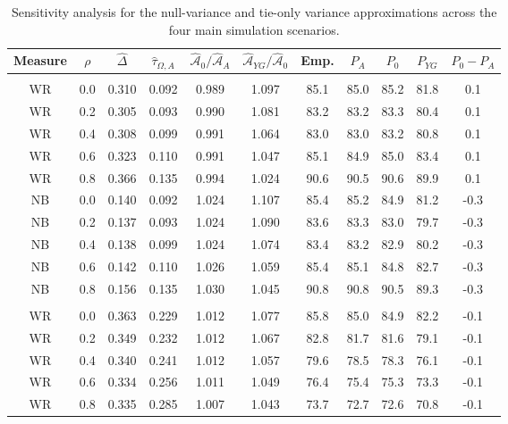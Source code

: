 \begin{table}[p]
\centering
\caption{Sensitivity analysis for the null-variance and tie-only variance approximations across the four main simulation scenarios.}
\label{tab:appendix_equal_variance_sensitivity_all}
\setlength{\tabcolsep}{2.1pt}
\scriptsize
\begin{tabular}{@{}ccccccccccc@{}}
\toprule
Measure & $\rho$ & $\widehat{\Delta}$ & $\widehat{\tau}_{\Omega,A}$ & $\widehat{\mathcal A}_0/\widehat{\mathcal A}_A$ & $\widehat{\mathcal A}_{YG}/\widehat{\mathcal A}_0$ & Emp. & $P_A$ & $P_0$ & $P_{YG}$ & $P_0-P_A$ \\
\midrule
\addlinespace[3pt]
\multicolumn{11}{@{}l}{\textbf{S1: Continuous + Continuous ($m=n=274$)}}\\
WR & 0.0 & 0.310 & 0.092 & 0.989 & 1.097 & 85.1 & 85.0 & 85.2 & 81.8 & 0.1 \\
WR & 0.2 & 0.305 & 0.093 & 0.990 & 1.081 & 83.2 & 83.2 & 83.3 & 80.4 & 0.1 \\
WR & 0.4 & 0.308 & 0.099 & 0.991 & 1.064 & 83.0 & 83.0 & 83.2 & 80.8 & 0.1 \\
WR & 0.6 & 0.323 & 0.110 & 0.991 & 1.047 & 85.1 & 84.9 & 85.0 & 83.4 & 0.1 \\
WR & 0.8 & 0.366 & 0.135 & 0.994 & 1.024 & 90.6 & 90.5 & 90.6 & 89.9 & 0.1 \\
NB & 0.0 & 0.140 & 0.092 & 1.024 & 1.107 & 85.4 & 85.2 & 84.9 & 81.2 & -0.3 \\
NB & 0.2 & 0.137 & 0.093 & 1.024 & 1.090 & 83.6 & 83.3 & 83.0 & 79.7 & -0.3 \\
NB & 0.4 & 0.138 & 0.099 & 1.024 & 1.074 & 83.4 & 83.2 & 82.9 & 80.2 & -0.3 \\
NB & 0.6 & 0.142 & 0.110 & 1.026 & 1.059 & 85.4 & 85.1 & 84.8 & 82.7 & -0.3 \\
NB & 0.8 & 0.156 & 0.135 & 1.030 & 1.045 & 90.8 & 90.8 & 90.5 & 89.3 & -0.3 \\
\addlinespace[3pt]
\multicolumn{11}{@{}l}{\textbf{S2: Continuous + Binary ($m=n=269$)}}\\
WR & 0.0 & 0.363 & 0.229 & 1.012 & 1.077 & 85.8 & 85.0 & 84.9 & 82.2 & -0.1 \\
WR & 0.2 & 0.349 & 0.232 & 1.012 & 1.067 & 82.8 & 81.7 & 81.6 & 79.1 & -0.1 \\
WR & 0.4 & 0.340 & 0.241 & 1.012 & 1.057 & 79.6 & 78.5 & 78.3 & 76.1 & -0.1 \\
WR & 0.6 & 0.334 & 0.256 & 1.011 & 1.049 & 76.4 & 75.4 & 75.3 & 73.3 & -0.1 \\
WR & 0.8 & 0.335 & 0.285 & 1.007 & 1.043 & 73.7 & 72.7 & 72.6 & 70.8 & -0.1 \\

\end{tabular}
\end{table}
